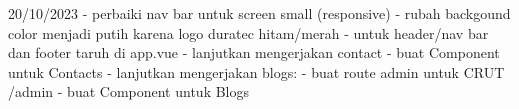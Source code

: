 20/10/2023
    - perbaiki nav bar untuk screen small (responsive)
    - rubah backgound color menjadi putih karena logo duratec hitam/merah 
    - untuk header/nav bar dan footer taruh di app.vue
    - lanjutkan mengerjakan contact
         - buat Component untuk Contacts
    - lanjutkan mengerjakan blogs:
        - buat route admin untuk CRUT   /admin
        - buat Component untuk Blogs

    
    